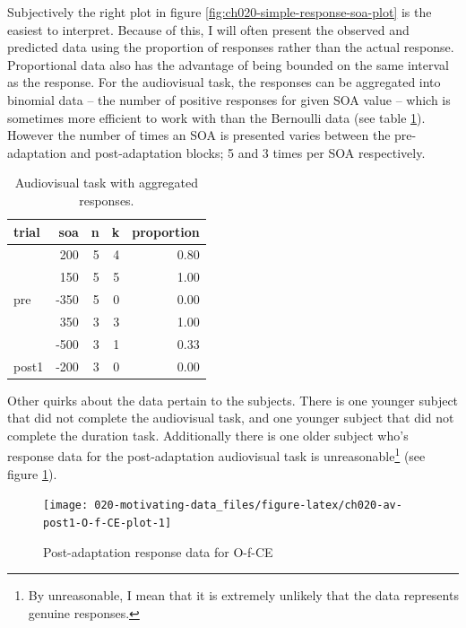 \documentclass[11pt, oneside, openany]{scrbook}
\begin{document}
Subjectively the right plot in figure \ref{fig:ch020-simple-response-soa-plot} is the easiest to interpret. Because of this, I will often present the observed and predicted data using the proportion of responses rather than the actual response. Proportional data also has the advantage of being bounded on the same interval as the response. For the audiovisual task, the responses can be aggregated into binomial data -- the number of positive responses for given SOA value -- which is sometimes more efficient to work with than the Bernoulli data (see table \ref{tab:ch020-av-bin-sample}). However the number of times an SOA is presented varies between the pre-adaptation and post-adaptation blocks; 5 and 3 times per SOA respectively.

\begin{table}[!h]

\caption{\label{tab:ch020-av-bin-sample}Audiovisual task with aggregated responses.}
\centering
\begin{tabular}[t]{lrrrr}
\toprule
trial & soa & n & k & proportion\\
\midrule
 & 200 & 5 & 4 & 0.80\\
\cmidrule{2-5}
 & 150 & 5 & 5 & 1.00\\
\cmidrule{2-5}
\multirow[t]{-3}{*}{\raggedright\arraybackslash pre} & -350 & 5 & 0 & 0.00\\
\cmidrule{1-5}
 & 350 & 3 & 3 & 1.00\\
\cmidrule{2-5}
 & -500 & 3 & 1 & 0.33\\
\cmidrule{2-5}
\multirow[t]{-3}{*}{\raggedright\arraybackslash post1} & -200 & 3 & 0 & 0.00\\
\bottomrule
\end{tabular}
\end{table}

Other quirks about the data pertain to the subjects. There is one younger subject that did not complete the audiovisual task, and one younger subject that did not complete the duration task. Additionally there is one older subject who's response data for the post-adaptation audiovisual task is unreasonable\footnote{By unreasonable, I mean that it is extremely unlikely that the data represents genuine responses.} (see figure \ref{fig:ch020-av-post1-O-f-CE-plot}).

\begin{figure}

{\centering \texttt{[image: 020-motivating-data\_files/figure-latex/ch020-av-post1-O-f-CE-plot-1]} 

}

\caption{Post-adaptation response data for O-f-CE}\label{fig:ch020-av-post1-O-f-CE-plot}
\end{figure}
\end{document}
